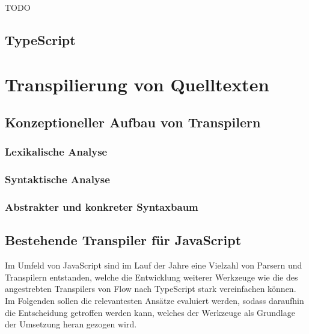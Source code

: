 TODO

\bigbreak


\subsection{TypeScript}

\section{Transpilierung von Quelltexten}

\subsection{Konzeptioneller Aufbau von Transpilern}




\subsubsection{Lexikalische Analyse}
\subsubsection{Syntaktische Analyse}
\subsubsection{Abstrakter und konkreter Syntaxbaum}

\subsection{Bestehende Transpiler für JavaScript}
\label{subsec:js-transpilers}


Im Umfeld von JavaScript sind im Lauf der Jahre eine Vielzahl von Parsern und Transpilern entstanden, welche die Entwicklung weiterer Werkzeuge wie die des angestrebten Transpilers von Flow nach TypeScript stark vereinfachen können. Im Folgenden sollen die relevantesten Ansätze evaluiert werden, sodass daraufhin die Entscheidung getroffen werden kann, welches der Werkzeuge als Grundlage der Umsetzung heran gezogen wird.

